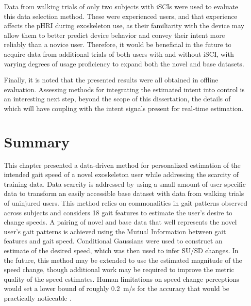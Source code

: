 Data from walking trials of only two subjects with iSCIs were used to evaluate this data selection method. These were experienced users, and that experience affects the pHRI during exoskeleton use, as their familiarity with the device may allow them to better predict device behavior and convey their intent more reliably than a novice user. Therefore, it would be beneficial in the future to acquire data from additional trials of both users with and without iSCI, with varying degrees of usage proficiency to expand both the novel and base datasets.

Finally, it is noted that the presented results were all obtained in offline evaluation. Assessing methods for integrating the estimated intent into control is an interesting next step, beyond the scope of this dissertation, the details of which will have coupling with the intent signals present for real-time estimation.

\section{Summary} \label{sec:conclusion}
%
This chapter presented a data-driven method for personalized estimation of the intended gait speed of a novel exoskeleton user while addressing the scarcity of training data. Data scarcity is addressed by using a small amount of user-specific data to transform an easily accessible base dataset with data from walking trials of uninjured users. This method relies on commonalities in gait patterns observed across subjects and considers 18 gait features to estimate the user's desire to change speeds. A pairing of novel and base data that well represents the novel user's gait patterns is achieved using the Mutual Information between gait features and gait speed. Conditional Gaussians were used to construct an estimate of the desired speed, which was then used to infer SU/SD changes. In the future, this method may be extended to use the estimated magnitude of the speed change, though additional work may be required to improve the metric quality of the speed estimates. Human limitations on speed change perceptions would set a lower bound of roughly 0.2~m/s for the  accuracy that would be practically noticeable \cite{zhang2015investigation}.